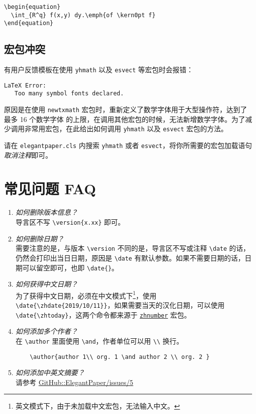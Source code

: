 \documentclass[lang=cn,a4paper,newtx]{elegantpaper}
\begin{document}
\begin{lstlisting}
\begin{equation}
  \int_{R^q} f(x,y) dy.\emph{of \kern0pt f}
\end{equation}
\end{lstlisting}

\subsection{宏包冲突}

有用户反馈模板在使用 \lstinline{yhmath} 以及 \lstinline{esvect} 等宏包时会报错：
\begin{lstlisting}
LaTeX Error:
   Too many symbol fonts declared.
\end{lstlisting}

原因是在使用 \lstinline{newtxmath} 宏包时，重新定义了数学字体用于大型操作符，达到了 {\heiti 最多 16 个数学字体} 的上限，在调用其他宏包的时候，无法新增数学字体。为了减少调用非常用宏包，在此给出如何调用 \lstinline{yhmath} 以及 \lstinline{esvect} 宏包的方法。

请在 \lstinline{elegantpaper.cls} 内搜索 \lstinline{yhmath} 或者 \lstinline{esvect}，将你所需要的宏包加载语句\textit{取消注释}即可。


\section{常见问题 FAQ}

\begin{enumerate}[label=\arabic*).]
  \item \textit{如何删除版本信息？}\\
    导言区不写 \lstinline|\version{x.xx}| 即可。
  \item \textit{如何删除日期？}\\
    需要注意的是，与版本 \lstinline{\version} 不同的是，导言区不写或注释 \lstinline{\date} 的话，仍然会打印出当日日期，原因是 \lstinline{\date} 有默认参数。如果不需要日期的话，日期可以留空即可，也即 \lstinline|\date{}|。
  \item \textit{如何获得中文日期？}\\
    为了获得中文日期，必须在中文模式下\footnote{英文模式下，由于未加载中文宏包，无法输入中文。}，使用 \lstinline|\date{\zhdate{2019/10/11}}|，如果需要当天的汉化日期，可以使用 \lstinline|\date{\zhtoday}|，这两个命令都来源于 \href{https://ctan.org/pkg/zhnumber}{\lstinline{zhnumber}} 宏包。
  \item \textit{如何添加多个作者？}\\
    在 \lstinline{\author} 里面使用 \lstinline{\and}，作者单位可以用 \lstinline{\\} 换行。
    \begin{lstlisting}
    \author{author 1\\ org. 1 \and author 2 \\ org. 2 }
    \end{lstlisting}
  \item \textit{如何添加中英文摘要？}\\
    请参考 \href{https://github.com/ElegantLaTeX/ElegantPaper/issues/5}{GitHub::ElegantPaper/issues/5}
\end{enumerate}
\end{document}
